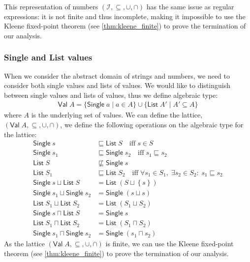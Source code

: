 This representation of numbers $(\mathscr{I}, \subseteq, \cup, \cap)$ has the same issue as regular expressions: it is not finite and thus incomplete, making it impossible to use the Kleene fixed-point theorem (see \autoref{thm:kleene_finite}) to prove the termination of our analysis.

\subsubsection{Single and List values}
When we consider the abstract domain of strings and numbers, we need to consider both single values and lists of values.
We would like to distinguish between single values and lists of values, thus we define algebraic type:
\begin{align}
    \mathsf{Val} \; A = \{ \mathsf{Single} \; a \mid a \in A \} \cup \{ \mathsf{List} \; A' \mid A' \subseteq A \}
\end{align}
where $A$ is the underlying set of values.
We can define the lattice, $(\mathsf{Val} \; A, \subseteq, \cup, \cap)$, we define the following operations on the algebraic type for the lattice:
\begin{align}
    \mathsf{Single} \; s &\sqsubseteq \mathsf{List} \; S \quad
    \text{iff} \; s \in S \\
    \mathsf{Single} \; s_1 &\sqsubseteq \mathsf{Single} \; s_2 \quad
    \text{iff} \; s_1 \sqsubseteq s_2 \\
    \mathsf{List} \; S &\not\sqsubseteq \mathsf{Single} \; s\\
    \mathsf{List} \; S_1 &\sqsubseteq \mathsf{List} \; S_2 \quad
    \text{iff} \; \forall s_1 \in S_1, \; \exists s_2 \in S_2: \; s_1 \sqsubseteq s_2\\
    \mathsf{Single} \; s \sqcup \mathsf{List} \; S &= \mathsf{List} \; (S\sqcup\left\{ s \right\})\\
    \mathsf{Single} \; s_1 \sqcup \mathsf{Single} \; s_2 &= \mathsf{Single} \; (s \sqcup s )\\
    \mathsf{List} \; S_1 \sqcup \mathsf{List} \; S_2 &= \mathsf{List} \; (S_1 \sqcup S_2)\\
    \mathsf{Single} \; s \sqcap \mathsf{List} \; S &= \mathsf{Single} \; s\\
    \mathsf{List} \; S_1 \sqcap \mathsf{List} \; S_2 &= \mathsf{List} \; (S_1 \sqcap S_2)\\
    \mathsf{Single} \; s_1 \sqcap \mathsf{Single} \; s_2 &= \mathsf{Single} \; (s_1 \sqcap s_2)
\end{align}
As the lattice $(\mathsf{Val} \; A, \subseteq, \cup, \cap)$ is finite, we can use the Kleene fixed-point theorem (see \autoref{thm:kleene_finite}) to prove the termination of our analysis.

